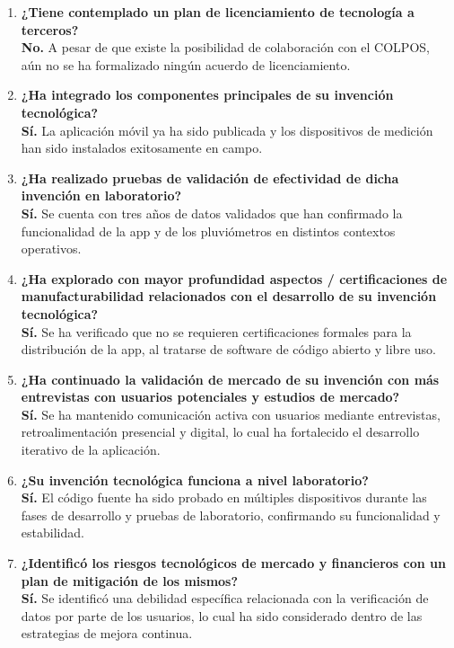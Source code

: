 \begin{enumerate}
\item \textbf{¿Tiene contemplado un plan de licenciamiento de tecnología a terceros?} \\
\textbf{No.} A pesar de que existe la posibilidad de colaboración con el COLPOS, aún no se ha formalizado ningún acuerdo de licenciamiento.

\item \textbf{¿Ha integrado los componentes principales de su invención tecnológica?} \\
\textbf{Sí.} La aplicación móvil ya ha sido publicada y los dispositivos de medición han sido instalados exitosamente en campo.

\item \textbf{¿Ha realizado pruebas de validación de efectividad de dicha invención en laboratorio?} \\
\textbf{Sí.} Se cuenta con tres años de datos validados que han confirmado la funcionalidad de la app y de los pluviómetros en distintos contextos operativos.

\item \textbf{¿Ha explorado con mayor profundidad aspectos / certificaciones de manufacturabilidad relacionados con el desarrollo de su invención tecnológica?} \\
\textbf{Sí.} Se ha verificado que no se requieren certificaciones formales para la distribución de la app, al tratarse de software de código abierto y libre uso.

\item \textbf{¿Ha continuado la validación de mercado de su invención con más entrevistas con usuarios potenciales y estudios de mercado?} \\
\textbf{Sí.} Se ha mantenido comunicación activa con usuarios mediante entrevistas, retroalimentación presencial y digital, lo cual ha fortalecido el desarrollo iterativo de la aplicación.

\item \textbf{¿Su invención tecnológica funciona a nivel laboratorio?} \\
\textbf{Sí.} El código fuente ha sido probado en múltiples dispositivos durante las fases de desarrollo y pruebas de laboratorio, confirmando su funcionalidad y estabilidad.

\item \textbf{¿Identificó los riesgos tecnológicos de mercado y financieros con un plan de mitigación de los mismos?} \\
\textbf{Sí.} Se identificó una debilidad específica relacionada con la verificación de datos por parte de los usuarios, lo cual ha sido considerado dentro de las estrategias de mejora continua.


\end{enumerate}
